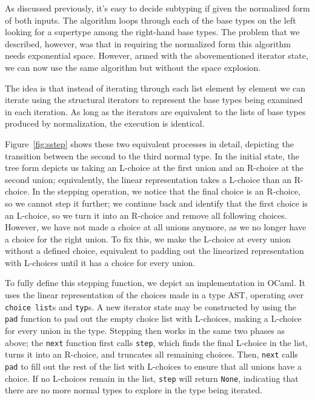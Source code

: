 \documentclass[a4paper,english]{lipics-v2019}
\begin{document}
As discussed previously, it's easy to decide subtyping if given the normalized
form of both inputs. The algorithm loops through each of the base types on the
left looking for a supertype among the right-hand base types. The problem that
we described, however, was that in requiring the normalized form this
algorithm needs exponential space. However, armed with the abovementioned
iterator state, we can now use the same algorithm but without the space
explosion.

The idea is that instead of iterating through each list element by element
we can iterate using the structural iterators to represent the base types
being examined in each iteration. As long as the iterators are equivalent to
the lists of base types produced by normalization, the execution is identical.

Figure~\ref{fig:sstep} shows these two equivalent processes in detail,
depicting the transition between the second to the third normal type. In
the initial state, the tree form depicts us taking an L-choice at the first
union and an R-choice at the second union; equivalently, the linear representation
takes a L-choice than an R-choice. In the stepping operation, we notice that the
final choice is an R-choice, so we cannot step it further; we continue back and
identify that the first choice is an L-choice, so we turn it into an R-choice and
remove all following choices. However, we have not made a choice at all unions
anymore, as we no longer have a choice for the right union. To fix this, we make
the L-choice at every union without a defined choice, equivalent to padding out
the linearized representation with L-choices until it has a choice for every union.

To fully define this stepping function, we depict an implementation in OCaml.
It uses the linear representation of the choices made in a type AST, operating
over \lstinline{choice list}s and \lstinline{typ}s. A new iterator state may
be constructed by using the \lstinline{pad} function to pad out the empty
choice list with L-choices, making a L-choice for every union in the type.
Stepping then works in the same two phases as above; the \lstinline{next}
function first calls \lstinline{step}, which finds the final L-choice in the
list, turns it into an R-choice, and truncates all remaining choices. Then,
\lstinline{next} calls \lstinline{pad} to fill out the rest of the list with
L-choices to ensure that all unions have a choice. If no L-choices remain in
the list, \lstinline{step} will return \lstinline{None}, indicating that there
are no more normal types to explore in the type being iterated.
\end{document}
